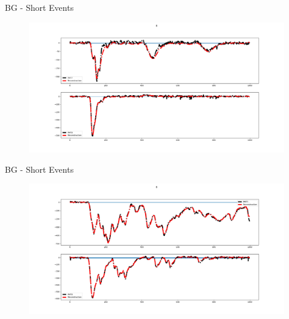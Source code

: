 \documentclass{beamer}
\begin{document}
\begin{frame}{BG - Short Events}
\begin{figure}[h]
\includegraphics[width=1\textwidth]{event2.png}
\end{figure}
\end{frame}

\begin{frame}{BG - Short Events}
\begin{figure}[h]
\includegraphics[width=1\textwidth]{event3.png}
\end{figure}
\end{frame}
\end{document}
